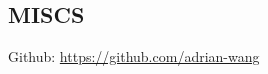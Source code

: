 \documentclass[line,margin]{res}
\begin{document}
\begin{resume}
\section{MISCS}
            Github: \href{https://github.com/adrian-wang}{https://github.com/adrian-wang}
\end{resume}
\end{document}
